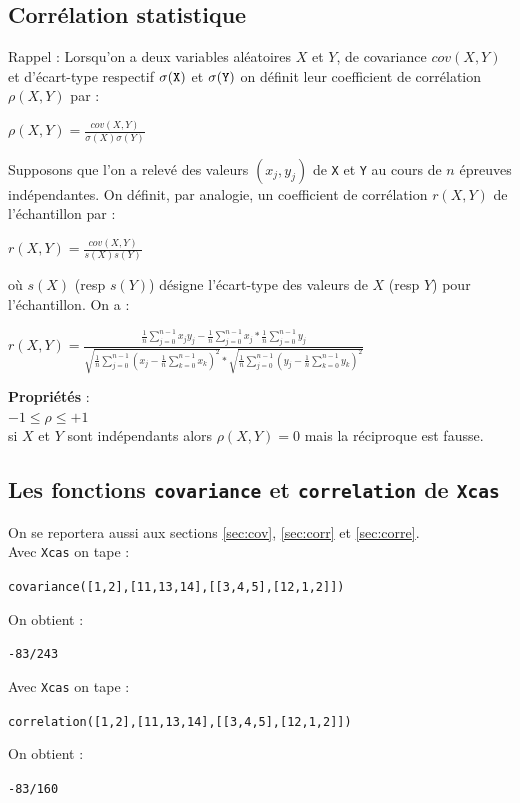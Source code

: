 \documentclass[a4paper,11pt]{book}
\begin{document}
\subsection{Corr\'elation statistique}
Rappel : Lorsqu'on a deux variables al\'eatoires $X$ et $Y$, 
de covariance  $cov(X,Y)$  et  d'\'ecart-type respectif  ${\tt\sigma(X)}$
et ${\tt \sigma(Y)}$ on d\'efinit leur coefficient de corr\'elation 
$\rho(X,Y)$ par :
\begin{center}$\displaystyle \rho(X,Y)=\frac{cov(X,Y)}{\sigma(X)\sigma(Y)}$\end{center}
Supposons que l'on a relev\'e des valeurs $(x_j,y_j)$ de {\tt X} et {\tt Y} au
cours de $n$ \'epreuves ind\'ependantes. On d\'efinit, par analogie, un 
coefficient de corr\'elation $r(X,Y)$ de l'\'echantillon par :\\
\begin{center}$\displaystyle r(X,Y)=\frac{cov(X,Y)}{s(X)s(Y)}$\end{center} 
o\`u $s(X)$ (resp $s(Y)$) d\'esigne l'\'ecart-type des valeurs de $X$ 
(resp $Y$) pour l'\'echantillon. On a :\\
\begin{center}$r(X,Y)=\frac{\frac{1}{n}\sum_{j=0}^{n-1} x_jy_j-\frac{1}{n}\sum_{j=0}^{n-1} x_j*\frac{1}{n}\sum_{j=0}^{n-1} y_j}{\sqrt{\frac{1}{n}\sum_{j=0}^{n-1} (x_j-\frac{1}{n}\sum_{k=0}^{n-1} x_k)^2}*\sqrt{\frac{1}{n}\sum_{j=0}^{n-1} (y_j-\frac{1}{n}\sum_{k=0}^{n-1} y_k)^2}}$\end{center}
{\bf Propri\'et\'es }:\\
$-1 \leq \rho \leq +1$\\
si $X$ et $Y$ sont ind\'ependants alors $\rho(X,Y)=0$ mais la 
r\'eciproque est fausse.
\subsection{Les fonctions {\tt covariance} et {\tt correlation} de {\tt Xcas}} 
On se reportera aussi aux sections \ref{sec:cov}, \ref{sec:corr} et 
\ref{sec:corre}.\\
Avec {\tt Xcas} on tape :
\begin{center}{\tt covariance([1,2],[11,13,14],[[3,4,5],[12,1,2]])}\end{center}
On obtient :
\begin{center}{\tt -83/243}\end{center}
Avec {\tt Xcas} on tape :
\begin{center}{\tt correlation([1,2],[11,13,14],[[3,4,5],[12,1,2]])}\end{center}
On obtient :
\begin{center}{\tt -83/160}\end{center}
\end{document}
